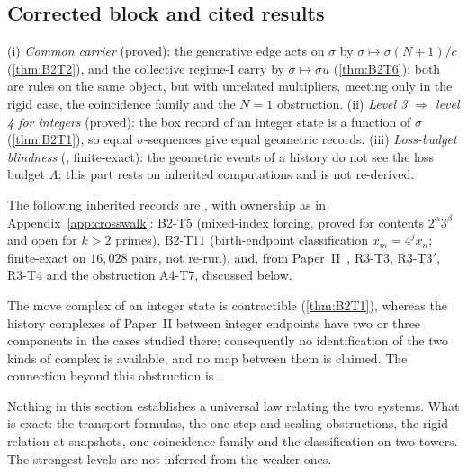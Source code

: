 \subsection{Corrected block and cited results}
\begin{proposition}\label{prop:B2T14}
(i) \emph{Common carrier} (proved): the generative edge acts on $\sigma$ by $\sigma\mapsto\sigma(N+1)/c$ (\cref{thm:B2T2}), and the collective regime-I carry by $\sigma\mapsto\sigma u$ (\cref{thm:B2T6}); both are rules on the same object, but with unrelated multipliers, meeting only in the rigid case, the coincidence family and the $N=1$ obstruction. (ii) \emph{Level 3 $\Rightarrow$ level 4 for integers} (proved): the box record of an integer state is a function of $\sigma$ (\cref{thm:B2T1}), so equal $\sigma$-sequences give equal geometric records. (iii) \emph{Loss-budget blindness} (, finite-exact): the geometric events of a history do not see the loss budget $\Lambda$; this part rests on inherited computations and is not re-derived.
\end{proposition}
\begin{remark}[cited]
The following inherited records are , with ownership as in Appendix~\ref{app:crosswalk}: B2-T5 (mixed-index forcing, proved for contents $2^\alpha3^\beta$ and open for $k>2$ primes), B2-T11 (birth-endpoint classification $x_m=4^jx_n$; finite-exact on $16{,}028$ pairs, not re-run), and, from Paper~II~\cite{PaperII}, R3-T3, R3-T3$'$, R3-T4 and the obstruction A4-T7, discussed below.
\end{remark}
\begin{proposition}\label{prop:A4T7}
The move complex of an integer state is contractible (\cref{thm:B2T1}), whereas the history complexes of Paper~II between integer endpoints have two or three components in the cases studied there; consequently no identification of the two kinds of complex is available, and no map between them is claimed. The connection beyond this obstruction is .
\end{proposition}
\begin{remark}
Nothing in this section establishes a universal law relating the two systems. What is exact: the transport formulas, the one-step and scaling obstructions, the rigid relation at snapshots, one coincidence family and the classification on two towers. The strongest levels are not inferred from the weaker ones.
\end{remark}
